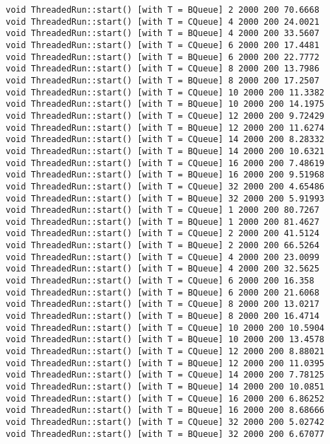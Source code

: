 \begin{verbatim}
void ThreadedRun::start() [with T = BQueue] 2 2000 200 70.6668
void ThreadedRun::start() [with T = CQueue] 4 2000 200 24.0021
void ThreadedRun::start() [with T = BQueue] 4 2000 200 33.5607
void ThreadedRun::start() [with T = CQueue] 6 2000 200 17.4481
void ThreadedRun::start() [with T = BQueue] 6 2000 200 22.7772
void ThreadedRun::start() [with T = CQueue] 8 2000 200 13.7986
void ThreadedRun::start() [with T = BQueue] 8 2000 200 17.2507
void ThreadedRun::start() [with T = CQueue] 10 2000 200 11.3382
void ThreadedRun::start() [with T = BQueue] 10 2000 200 14.1975
void ThreadedRun::start() [with T = CQueue] 12 2000 200 9.72429
void ThreadedRun::start() [with T = BQueue] 12 2000 200 11.6274
void ThreadedRun::start() [with T = CQueue] 14 2000 200 8.28332
void ThreadedRun::start() [with T = BQueue] 14 2000 200 10.6321
void ThreadedRun::start() [with T = CQueue] 16 2000 200 7.48619
void ThreadedRun::start() [with T = BQueue] 16 2000 200 9.51968
void ThreadedRun::start() [with T = CQueue] 32 2000 200 4.65486
void ThreadedRun::start() [with T = BQueue] 32 2000 200 5.91993
void ThreadedRun::start() [with T = CQueue] 1 2000 200 80.7267
void ThreadedRun::start() [with T = BQueue] 1 2000 200 81.4627
void ThreadedRun::start() [with T = CQueue] 2 2000 200 41.5124
void ThreadedRun::start() [with T = BQueue] 2 2000 200 66.5264
void ThreadedRun::start() [with T = CQueue] 4 2000 200 23.0099
void ThreadedRun::start() [with T = BQueue] 4 2000 200 32.5625
void ThreadedRun::start() [with T = CQueue] 6 2000 200 16.358
void ThreadedRun::start() [with T = BQueue] 6 2000 200 21.6068
void ThreadedRun::start() [with T = CQueue] 8 2000 200 13.0217
void ThreadedRun::start() [with T = BQueue] 8 2000 200 16.4714
void ThreadedRun::start() [with T = CQueue] 10 2000 200 10.5904
void ThreadedRun::start() [with T = BQueue] 10 2000 200 13.4578
void ThreadedRun::start() [with T = CQueue] 12 2000 200 8.88021
void ThreadedRun::start() [with T = BQueue] 12 2000 200 11.0395
void ThreadedRun::start() [with T = CQueue] 14 2000 200 7.78125
void ThreadedRun::start() [with T = BQueue] 14 2000 200 10.0851
void ThreadedRun::start() [with T = CQueue] 16 2000 200 6.86252
void ThreadedRun::start() [with T = BQueue] 16 2000 200 8.68666
void ThreadedRun::start() [with T = CQueue] 32 2000 200 5.02742
void ThreadedRun::start() [with T = BQueue] 32 2000 200 6.67077
\end{verbatim}


